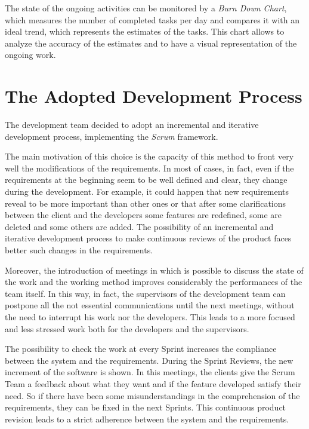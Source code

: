 			The state of the ongoing activities can be monitored by a \emph{Burn Down Chart}, which measures the number of completed tasks per day and compares it with an ideal trend, which represents the estimates of the tasks. This chart allows to analyze the accuracy of the estimates and to have a visual representation of the ongoing work. 

					
			
	
	
	\section{The Adopted Development Process}
		The development team decided to adopt an incremental and iterative development process, implementing the \emph{Scrum} framework. 

		The main motivation of this choice is the capacity of this method to front very well the modifications of the requirements. 
		In most of cases, in fact, even if the requirements at the beginning seem to be well defined and clear, they change during the development. For example, it could happen that new requirements reveal to be more important than other ones or that after some clarifications between the client and the developers some features are redefined, some are deleted and some others are added. The possibility of an incremental and iterative development process to make continuous reviews of the product faces better such changes in the requirements. 

		Moreover, the introduction of meetings in which is possible to discuss the state of the work and the working method improves considerably the performances of the team itself. In this way, in fact, the supervisors of the development team can postpone all the not essential communications until the next meetings, without the need to interrupt his work nor the developers. This leads to a more focused and less stressed work both for the developers and the supervisors.

		The possibility to check the work at every Sprint increases the compliance between the system and the requirements. During the Sprint Reviews, the new increment of the software is shown. In this meetings, the clients give the Scrum Team a feedback about what they want and if the feature developed satisfy their need. So if there have been some misunderstandings in the comprehension of the requirements, they can be fixed in the next Sprints. This continuous product revision leads to a strict adherence between the system and the requirements.

